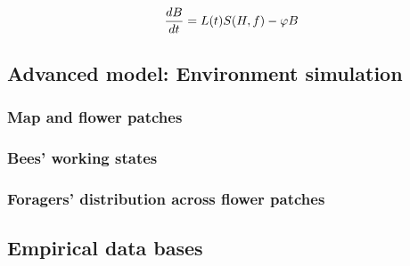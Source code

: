 		\begin{equation}\label{eq:changeBroodNumbersTime}
			{dB \over dt} = L(t)S(H,f)-\phi B
		\end{equation}
		

	
	
	\subsection{Advanced model: Environment simulation}
		
		\subsubsection{Map and flower patches}
		
		\subsubsection{Bees' working states}
			
		
		\subsubsection{Foragers' distribution across flower patches}
		
		
	\subsection{Empirical data bases}


